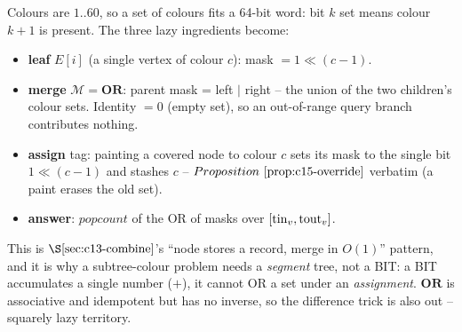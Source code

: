 Colours are \(1..60\), so a set of colours fits a 64-bit word: bit \(k\) set means colour \(k{+}1\) is present.  The three lazy ingredients become:

\begin{itemize}[nosep,leftmargin=1.4em]
  \item \textbf{leaf} \(E[i]\) (a single vertex of colour \(c\)): mask \(=1\!\ll\!(c-1)\).
  \item \textbf{merge} \(\mathcal{M}=\mathbf{OR}\): parent mask = left \(\mid\) right -- the union of the two children's colour sets.  Identity \(=0\) (empty set), so an out-of-range query branch contributes nothing.
  \item \textbf{assign} tag: painting a covered node to colour \(c\) sets its mask to the single bit \(1\!\ll\!(c-1)\) and stashes \(c\) -- \(\propref{c15-override}\) verbatim (a paint erases the old set).
  \item \textbf{answer}: \(\mathit{popcount}\) of the OR of masks over \([\operatorname{tin}_v,\operatorname{tout}_v]\).
\end{itemize}

\noindent This is \(\secref{c13-combine}\)'s ``node stores a record, merge in \(O(1)\)'' pattern, and it is why a subtree-colour problem needs a \emph{segment} tree, not a BIT: a BIT accumulates a single number (\(+\)), it cannot OR a set under an \emph{assignment}.  \(\mathbf{OR}\) is associative and idempotent but has no inverse, so the difference trick is also out -- squarely lazy territory.

